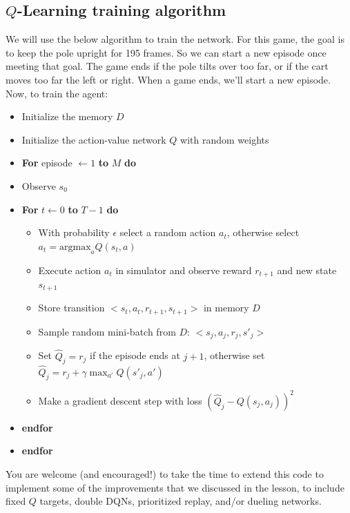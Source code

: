 \documentclass[11pt]{article}
\providecommand{\tightlist}{%
      \setlength{\itemsep}{0pt}\setlength{\parskip}{0pt}}
\begin{document}
    \subsection{\texorpdfstring{\(Q\)-Learning training
algorithm}{Q-Learning training algorithm}}\label{q-learning-training-algorithm}

We will use the below algorithm to train the network. For this game, the
goal is to keep the pole upright for 195 frames. So we can start a new
episode once meeting that goal. The game ends if the pole tilts over too
far, or if the cart moves too far the left or right. When a game ends,
we'll start a new episode. Now, to train the agent:

\begin{itemize}
\tightlist
\item
  Initialize the memory \(D\)
\item
  Initialize the action-value network \(Q\) with random weights
\item
  \textbf{For} episode \(\leftarrow 1\) \textbf{to} \(M\) \textbf{do}
\item
  Observe \(s_0\)
\item
  \textbf{For} \(t \leftarrow 0\) \textbf{to} \(T-1\) \textbf{do}

  \begin{itemize}
  \tightlist
  \item
    With probability \(\epsilon\) select a random action \(a_t\),
    otherwise select \(a_t = \mathrm{argmax}_a Q(s_t,a)\)
  \item
    Execute action \(a_t\) in simulator and observe reward \(r_{t+1}\)
    and new state \(s_{t+1}\)
  \item
    Store transition \(<s_t, a_t, r_{t+1}, s_{t+1}>\) in memory \(D\)
  \item
    Sample random mini-batch from \(D\): \(<s_j, a_j, r_j, s'_j>\)
  \item
    Set \(\hat{Q}_j = r_j\) if the episode ends at \(j+1\), otherwise
    set \(\hat{Q}_j = r_j + \gamma \max_{a'}{Q(s'_j, a')}\)
  \item
    Make a gradient descent step with loss
    \((\hat{Q}_j - Q(s_j, a_j))^2\)
  \end{itemize}
\item
  \textbf{endfor}
\item
  \textbf{endfor}
\end{itemize}

You are welcome (and encouraged!) to take the time to extend this code
to implement some of the improvements that we discussed in the lesson,
to include fixed \(Q\) targets, double DQNs, prioritized replay, and/or
dueling networks.
\end{document}
